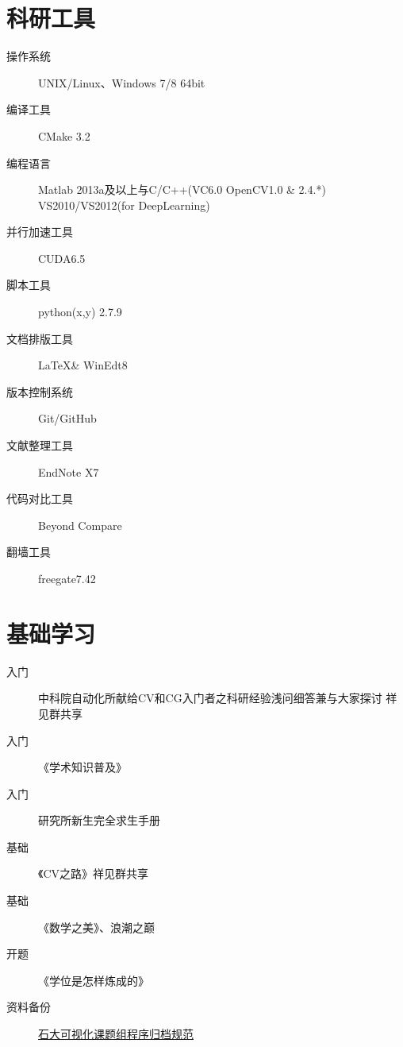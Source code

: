 \documentclass[a4paper，12pt]{article}
\begin{document}
\section{科研工具}

\begin{description}

\item[操作系统] UNIX/Linux、Windows 7/8 64bit

\item[编译工具] CMake 3.2

\item[编程语言] Matlab 2013a及以上与C/C++(VC6.0 OpenCV1.0 \& 2.4.*) VS2010/VS2012(for DeepLearning)

\item[并行加速工具] CUDA6.5

\item[脚本工具] python(x,y) 2.7.9

\item[文档排版工具] \LaTeX \& WinEdt8

\item[版本控制系统] Git/GitHub

\item[文献整理工具] EndNote X7

\item[代码对比工具] Beyond Compare

\item[翻墙工具] freegate7.42

\end{description}

\section{基础学习}

\begin{description}

\item[入门]中科院自动化所献给CV和CG入门者之科研经验浅问细答兼与大家探讨 祥见群共享

\item[入门]《学术知识普及》

\item[入门] 研究所新生完全求生手册

\item[基础]《CV之路》祥见群共享

\item[基础]《数学之美》、浪潮之巅

\item[开题]《学位是怎样炼成的》

\item[资料备份] \href{https://github.com/imistyrain/UPCRules}{石大可视化课题组程序归档规范}

\end{description}
\end{document}
